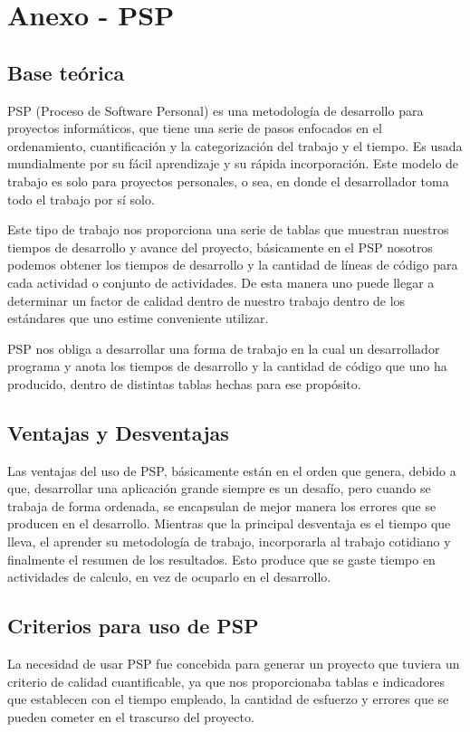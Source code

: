 \documentclass[a4paper,12pt,openany,oneside]{book}
\begin{document}
\chapter{Anexo - PSP}
\thispagestyle{empty}
\section{Base teórica}
PSP (Proceso de Software Personal) es una metodología de desarrollo para proyectos informáticos, que tiene una serie de pasos enfocados en el ordenamiento, cuantificación y la categorización del trabajo y el tiempo. Es usada mundialmente por su fácil aprendizaje y su rápida incorporación. Este modelo de trabajo es solo para proyectos personales, o sea, en donde el desarrollador toma todo el trabajo por sí solo.

Este tipo de trabajo nos proporciona una serie de tablas que muestran nuestros tiempos de desarrollo y avance del proyecto, básicamente en el PSP nosotros podemos obtener los tiempos de desarrollo y la cantidad de líneas de código para cada actividad o conjunto de actividades. De esta manera uno puede llegar a determinar un factor de calidad dentro de nuestro trabajo dentro de los estándares que uno estime conveniente utilizar.

PSP nos obliga a desarrollar una forma de trabajo en la cual un desarrollador programa y anota los tiempos de desarrollo y la cantidad de código que uno ha producido, dentro de distintas tablas hechas para ese propósito.

\section{Ventajas y Desventajas}
Las ventajas del uso de PSP, básicamente están en el orden que genera, debido a que, desarrollar una aplicación grande siempre es un desafío, pero cuando se trabaja de forma ordenada, se encapsulan de mejor manera los errores que se producen en el desarrollo. Mientras que la principal desventaja es el tiempo que lleva, el aprender su metodología de trabajo, incorporarla al trabajo cotidiano y finalmente el resumen de los resultados. Esto produce que se gaste tiempo en actividades de calculo, en vez de ocuparlo en el desarrollo.

\section{Criterios para uso de PSP}
La necesidad de usar PSP fue concebida para generar un proyecto que tuviera un criterio de calidad cuantificable, ya que nos proporcionaba tablas e indicadores que establecen con el tiempo empleado, la cantidad de esfuerzo y errores que se pueden cometer en el trascurso del proyecto.
\end{document}
